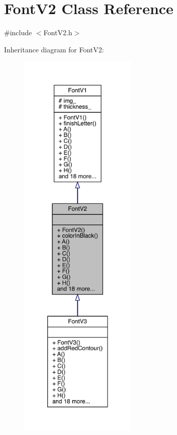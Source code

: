 \hypertarget{class_font_v2}{}\section{Font\+V2 Class Reference}
\label{class_font_v2}


{\ttfamily \#include $<$Font\+V2.\+h$>$}



Inheritance diagram for Font\+V2\+:\nopagebreak
\begin{figure}[H]
\begin{center}
\leavevmode
\includegraphics[height=550pt]{class_font_v2__inherit__graph}
\end{center}
\end{figure}


